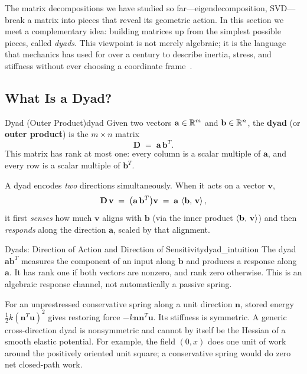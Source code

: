 The matrix decompositions we have studied so far---eigendecomposition,
SVD---break a matrix into pieces that reveal its geometric action.
In this section we meet a complementary idea: building matrices up
from the simplest possible pieces, called \emph{dyads}.
This viewpoint is not merely algebraic; it is the language that
mechanics has used for over a century to describe inertia, stress,
and stiffness without ever choosing a coordinate frame~\cite{Murray1994}.

\subsection{What Is a Dyad?}
\label{subsec:dyad-definition}

\begin{definition}{\texorpdfstring{Dyad (Outer Product)}{Dyad (Outer Product)}}{dyad}
Given two vectors $\mathbf{a}\in\mathbb{R}^{m}$ and
$\mathbf{b}\in\mathbb{R}^{n}$, the \textbf{dyad}
(or \textbf{outer product}) is the
$m\times n$ matrix
\[
  \mathbf{D} \;=\; \mathbf{a}\,\mathbf{b}^{T}.
\]
This matrix has rank at most one: every column is a scalar multiple
of $\mathbf{a}$, and every row is a scalar multiple of $\mathbf{b}^{T}$.
\end{definition}

A dyad encodes \emph{two} directions simultaneously.
When it acts on a vector $\mathbf{v}$,
\[
  \mathbf{D}\,\mathbf{v}
  \;=\;
  \bigl(\mathbf{a}\,\mathbf{b}^{T}\bigr)\mathbf{v}
  \;=\;
  \mathbf{a}\,\left\langle \mathbf{b},\, \mathbf{v} \right\rangle,
\]
it first \emph{senses} how much $\mathbf{v}$ aligns with $\mathbf{b}$
(via the inner product $\left\langle \mathbf{b},\, \mathbf{v} \right\rangle$) and then
\emph{responds} along the direction $\mathbf{a}$, scaled by that
alignment.

\begin{laymansbox}{Dyads: Direction of Action and Direction of Sensitivity}{dyad_intuition}
The dyad $\mathbf a\mathbf b^T$ measures the component of an input along $\mathbf b$ and produces a response along $\mathbf a$. It has rank one if both vectors are nonzero, and rank zero otherwise. This is an algebraic response channel, not automatically a passive spring.

For an unprestressed conservative spring along a unit direction $\mathbf n$, stored energy $\frac12k(\mathbf n^T\mathbf u)^2$ gives restoring force $-k\mathbf n\mathbf n^T\mathbf u$. Its stiffness is symmetric. A generic cross-direction dyad is nonsymmetric and cannot by itself be the Hessian of a smooth elastic potential. For example, the field $(0,x)$ does one unit of work around the positively oriented unit square; a conservative spring would do zero net closed-path work.

\end{laymansbox}

